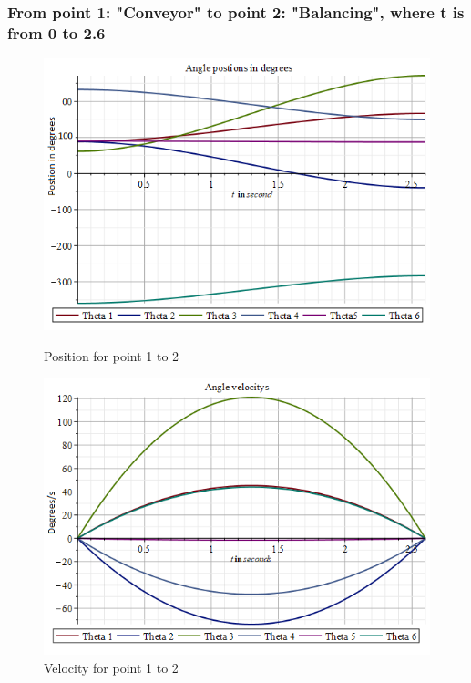 \subsubsection{From point 1: "Conveyor" to point 2: "Balancing", where t is from 0 to 2.6}

\begin{figure}[H]
  \centering
  \begin{minipage}[b]{0.45\textwidth}
    \includegraphics[width=\textwidth]{Design/poscb.png}
    \caption{Position for point 1 to 2}
    \label{fig:position}
  \end{minipage}
  \hfill
  \begin{minipage}[b]{0.45\textwidth}
    \includegraphics[width=\textwidth]{Design/velcb.png}
    \caption{Velocity for point 1 to 2}
    \label{fig:velocity}
  \end{minipage}
\end{figure}
